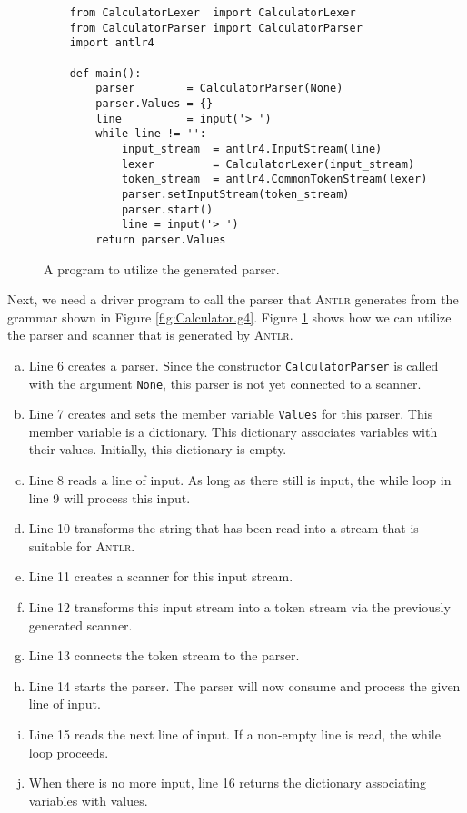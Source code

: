 \begin{figure}[!ht]
\centering
\begin{verbatim}
    from CalculatorLexer  import CalculatorLexer
    from CalculatorParser import CalculatorParser
    import antlr4
    
    def main():
        parser        = CalculatorParser(None)
        parser.Values = {}
        line          = input('> ')
        while line != '':
            input_stream  = antlr4.InputStream(line)
            lexer         = CalculatorLexer(input_stream)
            token_stream  = antlr4.CommonTokenStream(lexer)
            parser.setInputStream(token_stream)
            parser.start()
            line = input('> ')
        return parser.Values
\end{verbatim}
\vspace*{-0.3cm}
\caption{A program to utilize the generated parser.}
\label{fig:Calculator.ipynb}
\end{figure}

Next, we need a driver program to call the parser that \textsc{Antlr} generates from the grammar
shown in Figure \ref{fig:Calculator.g4}.  Figure \ref{fig:Calculator.ipynb} shows how we can utilize the parser
and scanner that is generated by \textsc{Antlr}.  
\begin{enumerate}[(a)]
\item Line 6 creates a parser.  Since the constructor \texttt{CalculatorParser} is called with the 
      argument \texttt{None}, this parser is not yet connected to a scanner.
\item Line 7 creates and sets the member variable \texttt{Values} for this parser.
      This member variable is a dictionary.  This dictionary associates variables with their values.
      Initially, this dictionary is empty.
\item Line 8 reads a line of input.  As long as there still is input, the while loop
      in line 9 will process this input.
\item Line 10 transforms the string that has been read into a stream that is suitable for \textsc{Antlr}.
\item Line 11 creates a scanner for this input stream.
\item Line 12 transforms this input stream into a token stream via the previously generated scanner.
\item Line 13 connects the token stream to the parser.
\item Line 14 starts the parser.  The parser will now consume and process the given line of
      input.  
\item Line 15 reads the next line of input.  If a non-empty line is read, the while loop proceeds.
\item When there is no more input, line 16 returns the dictionary associating variables with values. 
\end{enumerate}

